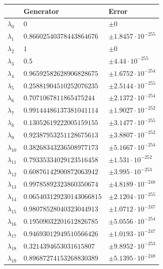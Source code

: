 \documentclass[a4paper,10pt]{article}
\begin{document}
\begin{appendix}
\begin{table}[h]
  \centering
  \begin{tabular}{|l|ll|}
  \hline
  {}             & Generator                 & Error \\
  \hline
  $\lambda_{0}$  & $0$                       &  $\pm 0$ \\
  $\lambda_{1}$  & $0.86602540378443864676$  &  $\pm 1.8457 \cdot 10^{-255}$ \\
  $\lambda_{2}$  & $1$                       &  $\pm 0$ \\
  $\lambda_{3}$  & $0.5$                     &  $\pm 4.44 \cdot 10^{-255}$ \\
  $\lambda_{4}$  & $0.96592582628906828675$  &  $\pm 1.6752 \cdot 10^{-254}$ \\
  $\lambda_{5}$  & $0.25881904510252076235$  &  $\pm 2.5144 \cdot 10^{-255}$ \\
  $\lambda_{6}$  & $0.7071067811865475244$   &  $\pm 2.1372 \cdot 10^{-254}$ \\
  $\lambda_{7}$  & $0.99144486137381041114$  &  $\pm 1.9027 \cdot 10^{-252}$ \\
  $\lambda_{8}$  & $0.13052619222005159155$  &  $\pm 3.1477 \cdot 10^{-255}$ \\
  $\lambda_{9}$  & $0.92387953251128675613$  &  $\pm 3.8807 \cdot 10^{-252}$ \\
  $\lambda_{10}$ & $0.38268343236508977173$  &  $\pm 5.1667 \cdot 10^{-254}$ \\
  $\lambda_{11}$ & $0.79335334029123516458$  &  $\pm 1.531 \cdot 10^{-252}$ \\
  $\lambda_{12}$ & $0.60876142900872063942$  &  $\pm 3.995 \cdot 10^{-253}$ \\
  $\lambda_{13}$ & $0.99785892323860350674$  &  $\pm 4.8189 \cdot 10^{-248}$ \\
  $\lambda_{14}$ & $0.065403129230143066815$ &  $\pm 2.1204 \cdot 10^{-255}$ \\
  $\lambda_{15}$ & $0.98078528040323044913$  &  $\pm 1.0712 \cdot 10^{-247}$ \\
  $\lambda_{16}$ & $0.19509032201612826785$  &  $\pm 5.0556 \cdot 10^{-254}$ \\
  $\lambda_{17}$ & $0.94693012949510566426$  &  $\pm 1.0193 \cdot 10^{-247}$ \\
  $\lambda_{18}$ & $0.3214394653031615807$   &  $\pm 9.8952 \cdot 10^{-253}$ \\
  $\lambda_{19}$ & $0.89687274153268830389$  &  $\pm 5.1395 \cdot 10^{-248}$ \\

\end{tabular}
\end{table}
\end{appendix}
\end{document}
